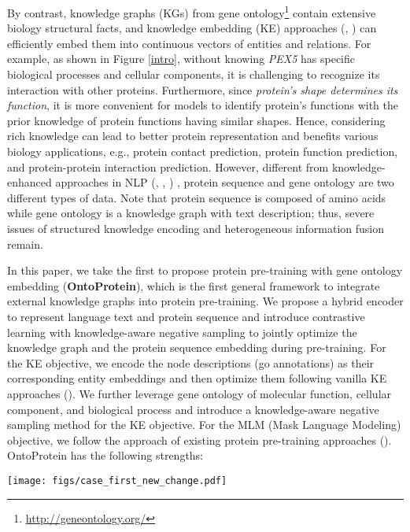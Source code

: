 By contrast, knowledge graphs (KGs) from gene ontology\footnote{\url{http://geneontology.org/}} contain extensive biology structural facts, and knowledge embedding (KE) approaches (\cite{DBLP:conf/nips/BordesUGWY13}, \cite{DBLP:conf/acl/ZhengWCYZZZQMZ20}) can efficiently embed them into continuous vectors of entities and relations. 
For example, as shown in Figure \ref{intro}, without knowing \emph{PEX5} has specific biological processes and cellular components, it is challenging to recognize its interaction with other proteins. 
Furthermore, since \emph{protein's shape determines its function}, it is more convenient for models to identify protein's functions with the prior knowledge of protein functions having similar shapes.
Hence, considering rich knowledge can lead to better protein representation and benefits various biology applications, e.g., protein contact prediction, protein function prediction, and protein-protein interaction prediction. 
However, different from knowledge-enhanced approaches in NLP {\color{highlight} (\cite{DBLP:conf/acl/ZhangHLJSL19}, \cite{DBLP:journals/tacl/WangGZZLLT21}, \cite{DBLP:conf/acl/WangTDWHJCJZ21}) }, protein sequence and gene ontology are two different types of data. 
Note that protein sequence is composed of amino acids while gene ontology is a knowledge graph with text description; thus, severe issues of structured knowledge encoding and heterogeneous information fusion remain. 

In this paper, we take the first to propose protein pre-training with gene ontology embedding (\textbf{OntoProtein}), which is the first general framework to integrate external knowledge graphs into protein pre-training.  
We propose a  hybrid encoder to represent language text and protein sequence and introduce contrastive learning with knowledge-aware negative sampling to jointly optimize the knowledge graph and the protein sequence embedding during pre-training. 
For the KE objective, we encode the node descriptions (go annotations) as their corresponding entity embeddings and then optimize them following vanilla KE approaches (\cite{DBLP:conf/nips/BordesUGWY13}). 
We further leverage gene ontology of molecular function, cellular component, and biological process and introduce a knowledge-aware negative sampling method for the KE objective. 
For the MLM {\color{highlight} (Mask Language Modeling)} objective, we follow the approach of existing protein pre-training approaches (\cite{DBLP:conf/iclr/RaoMSOR21}). 
OntoProtein has the following strengths:

\begin{figure*}[t]
\centering
\texttt{[image: figs/case\_first\_new\_change.pdf]}
\caption{
{\color{highlight}
\textbf{Left}: A protein example with biology knowledge (molecular function, biological process and cellular component): $K^{+}$ (potassium ion) Cyclic nucleotide-gated cation channel protein. \textbf{Right}: The corresponding sub-graph regarding $K^{+}$ carrier proteins in \textbf{ProteinKG25}. \textbf{Yellow} nodes are protein sequences and \textbf{blue} nodes are GO (Gene Ontology) entities with biological descriptions.
}
}
\label{intro}
\end{figure*}

